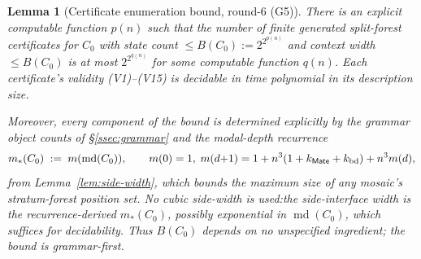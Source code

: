 \documentclass[11pt]{article}
\newtheorem{lemma}[theorem]{Lemma}
\newcommand{\Mate}{\mathsf{Mate}}
\newcommand{\md}{\operatorname{md}}
\begin{document}
\begin{lemma}[Certificate enumeration bound, round-6 (G5)]\label{lem:enumeration}
There is an explicit computable function $p(n)$ such that the number
of finite generated split-forest certificates for $C_0$ with state
count $\le B(C_0):=2^{2^{p(n)}}$ and context width $\le B(C_0)$ is
at most $2^{2^{q(n)}}$ for some computable function $q(n)$.  Each
certificate's validity (V1)--(V15) is decidable in time polynomial
in its description size.

Moreover, every component of the bound is determined explicitly by
the grammar object counts of \S\ref{ssec:grammar} and the modal-depth
recurrence
\[
  m_*(C_0)\;:=\;m(\md(C_0)),\qquad
  m(0)=1,\;m(d{+}1)=1+n^3(1+k_{\Mate}+k_{\rm bd})+n^3 m(d),
\]
from Lemma~\ref{lem:side-width}, which bounds the maximum size of
any mosaic's stratum-forest position set.  No cubic side-width is
used:\@ the side-interface width is the recurrence-derived
$m_*(C_0)$, possibly exponential in $\md(C_0)$, which suffices for
decidability.  Thus $B(C_0)$ depends on no unspecified ingredient;
the bound is grammar-first.
\end{lemma}
\end{document}
